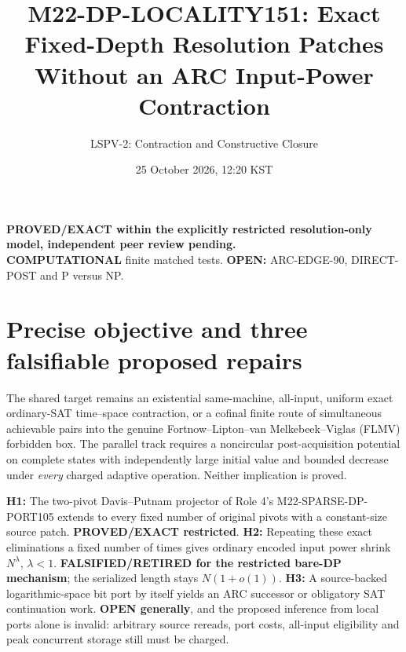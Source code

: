 \documentclass[11pt]{article}
\title{M22-DP-LOCALITY151: Exact Fixed-Depth Resolution Patches\\Without an ARC Input-Power Contraction}
\author{LSPV-2: Contraction and Constructive Closure}
\date{25 October 2026, 12:20 KST}
\begin{document}
\maketitle
\begin{center}
\textbf{PROVED/EXACT within the explicitly restricted resolution-only model, independent peer review pending.}\\
\textbf{COMPUTATIONAL} finite matched tests. \textbf{OPEN:} ARC-EDGE-90, DIRECT-POST and P versus NP.
\end{center}

\section{Precise objective and three falsifiable proposed repairs}
The shared target remains an existential same-machine, all-input, uniform exact ordinary-SAT time--space contraction, or a cofinal finite route of simultaneous achievable pairs into the genuine Fortnow--Lipton--van Melkebeek--Viglas (FLMV) forbidden box. The parallel track requires a noncircular post-acquisition potential on complete states with independently large initial value and bounded decrease under \emph{every} charged adaptive operation. Neither implication is proved.

\noindent\textbf{H1:} The two-pivot Davis--Putnam projector of Role 4's M22-SPARSE-DP-PORT105 extends to every fixed number of original pivots with a constant-size source patch. \textbf{PROVED/EXACT restricted}. \textbf{H2:} Repeating these exact eliminations a fixed number of times gives ordinary encoded input power shrink $N^\lambda$, $\lambda<1$. \textbf{FALSIFIED/RETIRED for the restricted bare-DP mechanism}; the serialized length stays $N(1+o(1))$. \textbf{H3:} A source-backed logarithmic-space bit port by itself yields an ARC successor or obligatory SAT continuation work. \textbf{OPEN generally}, and the proposed inference from local ports alone is invalid: arbitrary source rereads, port costs, all-input eligibility and peak concurrent storage still must be charged.
\end{document}

